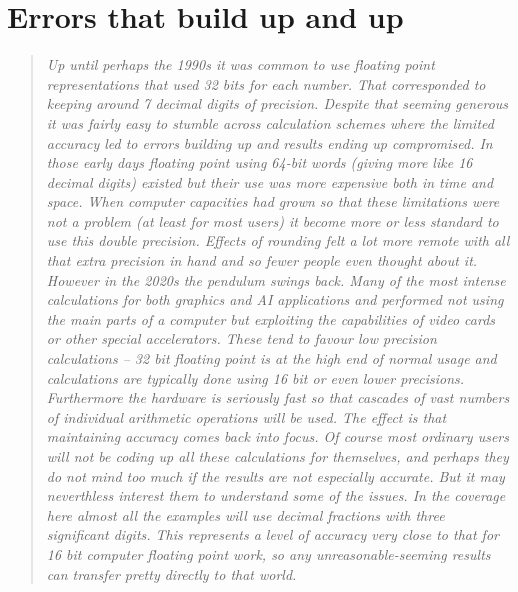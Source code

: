 \section{Errors that build up and up}
\begin{quotation}\textit{
Up until perhaps the 1990s it was common to use floating point representations
that used 32 bits for each number. That corresponded to keeping around 7
decimal digits of precision. Despite that seeming generous it was fairly
easy to stumble across calculation schemes where the limited accuracy led
to errors building up and results ending up compromised. In those early
days floating point using 64-bit words (giving more like 16 decimal
digits) existed but their use was more expensive both in time and space.
When computer capacities had grown so that these limitations were not a
problem (at least for most users) it become more or less standard to use this
double precision. Effects of rounding felt a lot more remote with all that
extra precision in hand and so fewer people even thought about it.
However in the 2020s the pendulum swings back. Many of the most intense
calculations for both graphics and AI applications and performed not
using the main parts of a computer but exploiting the capabilities of
video cards or other special accelerators. These tend to favour low
precision calculations -- 32 bit floating point is at the high end of
normal usage and calculations are typically done using 16 bit or even
lower precisions. Furthermore the hardware is seriously fast so that
cascades of vast numbers of individual arithmetic operations will be
used. The effect is that maintaining accuracy comes back into focus.
Of course most ordinary users will not be coding up all these calculations
for themselves, and perhaps they do not mind too much if the results are
not especially accurate. But it may neverthless interest them to understand
some of the issues. In the coverage here almost all the examples will
use decimal fractions with three significant digits. This represents
a level of accuracy very close to that for 16 bit computer floating point
work, so any unreasonable-seeming results can transfer pretty directly to
that world.
}\end{quotation}



